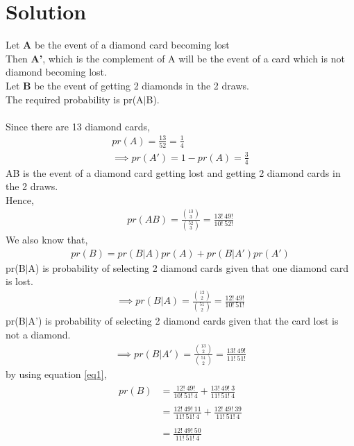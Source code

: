 \documentclass[journal,12pt,twocolumn]{IEEEtran}
\begin{document}
\section{Solution}
Let \textbf{A} be the event of a diamond card becoming lost\\
Then \textbf{A'}, which is the complement of A will be the event of a card which is not diamond becoming lost.\\
Let \textbf{B} be the event of getting 2 diamonds in the 2 draws.\\
The required probability is pr(A$|$B).\\
\\Since there are 13 diamond cards,
\begin{align}
    pr(A)=\frac{13}{52}=\frac{1}{4}\\
    \implies pr(A')=1-pr(A)=\frac{3}{4}
\end{align}
AB is the event of a diamond card getting lost and getting 2 diamond cards in the 2 draws.\\
Hence,
\begin{align}
    pr(AB)=\frac{\binom{13}{3}}{\binom{52}{3}}=\frac{13!\:49!}{10!\:52!}
\end{align}
We also know that,
\begin{align}
    pr(B)=pr(B \vert A)pr(A)+pr(B \vert A')pr(A') \label{eq1}
\end{align}
 pr(B$|$A) is probability of selecting 2 diamond cards given that one diamond card is lost.
\begin{align}
   \implies pr(B \vert A)=\frac{\binom{12}{2}}{\binom{51}{2}}=\frac{12!\:49!}{10!\:51!}
\end{align}
pr(B$|$A') is probability of selecting 2 diamond cards given that the card lost is not a diamond.
\begin{align}
    \implies pr(B \vert A')=\frac{\binom{13}{2}}{\binom{51}{2}}=\frac{13!\:49!}{11!\:51!}
\end{align}
by using equation \ref{eq1},
\begin{align}
\begin{split}
    pr(B)&=\frac{12!\:49!}{10!\:51!\:4}+\frac{13!\:49!\:3}{11!\:51!\:4}\\\\
         &=\frac{12!\:49!\:11}{11!\:51!\:4}+\frac{12!\:49!\:39}{11!\:51!\:4}\\\\
         &=\frac{12!\:49!\:50}{11!\:51!\:4}
\end{split}
\end{align}
\end{document}
